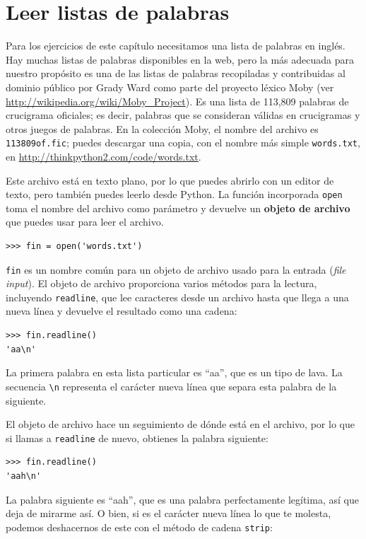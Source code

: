 \documentclass[10pt]{book}
\begin{document}
\section{Leer listas de palabras}
\label{wordlist}

Para los ejercicios de este capítulo necesitamos una lista de palabras en inglés.
Hay muchas listas de palabras disponibles en la web, pero la más
adecuada para nuestro propósito es una de las listas de palabras recopiladas y
contribuidas al dominio público por Grady Ward como parte del proyecto léxico Moby
(ver \url{http://wikipedia.org/wiki/Moby_Project}).  Es
una lista de 113,809 palabras de crucigrama oficiales; es decir, palabras que se
consideran válidas en crucigramas y otros juegos de palabras.  En la
colección Moby, el nombre del archivo es {\tt 113809of.fic}; puedes descargar
una copia, con el nombre más simple {\tt words.txt}, en
\url{http://thinkpython2.com/code/words.txt}.

Este archivo está en texto plano, por lo que puedes abrirlo con un editor
de texto, pero también puedes leerlo desde Python.  La función incorporada
{\tt open} toma el nombre del archivo como parámetro
y devuelve un {\bf objeto de archivo} que puedes usar para leer el archivo.

\begin{verbatim}
>>> fin = open('words.txt')
\end{verbatim}
%
{\tt fin} es un nombre común para un objeto de archivo usado para la entrada ({\em file input}).  El objeto
de archivo proporciona varios métodos para la lectura, incluyendo {\tt readline},
que lee caracteres desde un archivo hasta que llega a una nueva línea y
devuelve el resultado como una cadena: 

\begin{verbatim}
>>> fin.readline()
'aa\n'
\end{verbatim}
%
La primera palabra en esta lista particular es ``aa'', que es un tipo de
lava.  La secuencia \verb"\n" representa el carácter nueva línea que
separa esta palabra de la siguiente.

El objeto de archivo hace un seguimiento de dónde está en el archivo, por lo que
si llamas a {\tt readline} de nuevo, obtienes la palabra siguiente:

\begin{verbatim}
>>> fin.readline()
'aah\n'
\end{verbatim}
%
La palabra siguiente es ``aah'', que es una palabra perfectamente legítima,
así que deja de mirarme así.
O bien, si es el carácter nueva línea lo que te molesta,
podemos deshacernos de este con el método de cadena {\tt strip}:
\end{document}
